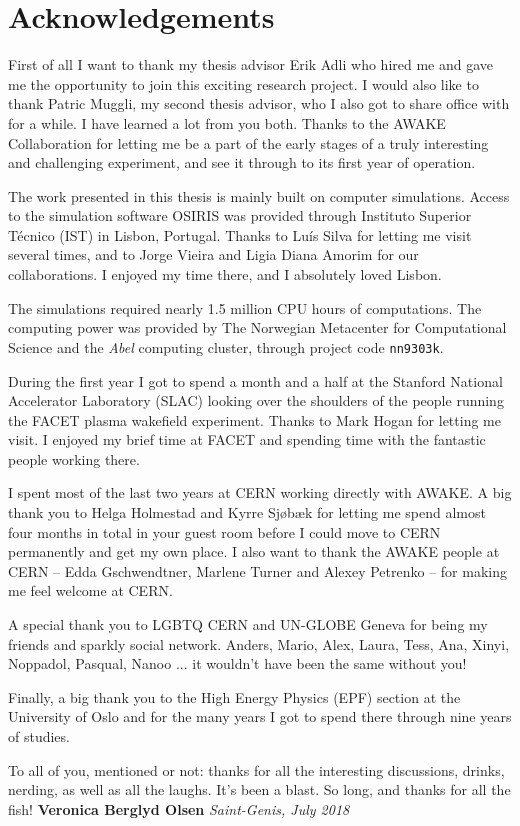 \chapter*{Acknowledgements}

First of all I want to thank my thesis advisor Erik Adli who hired me and gave me the opportunity to join this exciting research project.
I would also like to thank Patric Muggli, my second thesis advisor, who I also got to share office with for a while.
I have learned a lot from you both.
Thanks to the AWAKE Collaboration for letting me be a part of the early stages of a truly interesting and challenging experiment, and see it through to its first year of operation.

The work presented in this thesis is mainly built on computer simulations.
Access to the simulation software OSIRIS was provided through Instituto Superior Técnico (IST) in Lisbon, Portugal.
Thanks to Luís Silva for letting me visit several times, and to Jorge Vieira and Ligia Diana Amorim for our collaborations.
I enjoyed my time there, and I absolutely loved Lisbon.

The simulations required nearly 1.5 million CPU hours of computations.
The computing power was provided by The Norwegian Metacenter for Computational Science and the \textit{Abel} computing cluster, through project code \texttt{nn9303k}.

During the first year I got to spend a month and a half at the Stanford National Accelerator Laboratory (SLAC) looking over the shoulders of the people running the FACET plasma wakefield experiment.
Thanks to Mark Hogan for letting me visit.
I enjoyed my brief time at FACET and spending time with the fantastic people working there.

I spent most of the last two years at CERN working directly with AWAKE.
A big thank you to Helga Holmestad and Kyrre Sjøbæk for letting me spend almost four months in total in your guest room before I could move to CERN permanently and get my own place.
I also want to thank the AWAKE people at CERN -- Edda Gschwendtner, Marlene Turner and Alexey Petrenko -- for making me feel welcome at CERN.

A special thank you to LGBTQ CERN and UN-GLOBE Geneva for being my friends and sparkly social network.
Anders, Mario, Alex, Laura, Tess, Ana, Xinyi, Noppadol, Pasqual, Nanoo ... it wouldn't have been the same without you!

Finally, a big thank you to the High Energy Physics (EPF) section at the University of Oslo and for the many years I got to spend there through nine years of studies.

To all of you, mentioned or not: thanks for all the interesting discussions, drinks, nerding, as well as all the laughs.
It's been a blast.
So long, and thanks for all the fish!
\newline
\newline
\null\hfill\textbf{Veronica Berglyd Olsen}
\newline
\null\hfill\textit{Saint-Genis, July 2018}

